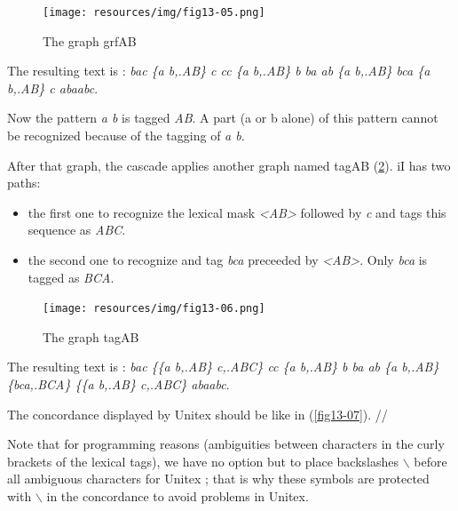 \begin{figure}[!htb]
  \centering
  \texttt{[image: resources/img/fig13-05.png]}
  \caption{The graph grfAB}
  \label{fig13-05}
\end{figure}

\bigskip
\noindent The resulting text is : \emph{bac \{a b,.AB\} c cc \{a b,.AB\} b ba ab \{a b,.AB\} bca \{a b,.AB\} c abaabc}.

\bigskip
\noindent Now the pattern \emph{a b} is tagged \emph{AB}. A part (a or b alone) of this pattern cannot be recognized because of the tagging of \emph{a b}. 

\bigskip
\noindent After that graph, the cascade applies another graph named tagAB (\ref{fig13-06}). iI has two paths: 
\begin{itemize}
	\item the first one to recognize the lexical mask \textit{<AB>} followed by \textit{c} and tags this sequence as \textit{ABC}.
  \item the second one to recognize and tag \textit{bca} preceeded by \textit{<AB>}. Only \textit{bca} is tagged as \textit{BCA}.
\end{itemize}

\begin{figure}[!htb]
  \centering
  \texttt{[image: resources/img/fig13-06.png]}
  \caption{The graph tagAB}
  \label{fig13-06}
\end{figure}

\bigskip
\noindent The resulting text is : \emph{bac \{\{a b,.AB\} c,.ABC\} cc \{a b,.AB\} b ba ab \{a b,.AB\} \{bca,.BCA\} \{\{a b,.AB\} c,.ABC\} abaabc}.


\bigskip
\noindent The concordance displayed by Unitex should be like in (\ref{fig13-07}). //

Note that for programming reasons (ambiguities between characters in the curly brackets of the lexical tags), we have no option but to place backslashes $\backslash$ before all ambiguous characters for Unitex ; that is why these symbols are protected with $\backslash$ in the concordance to avoid problems in Unitex. 

